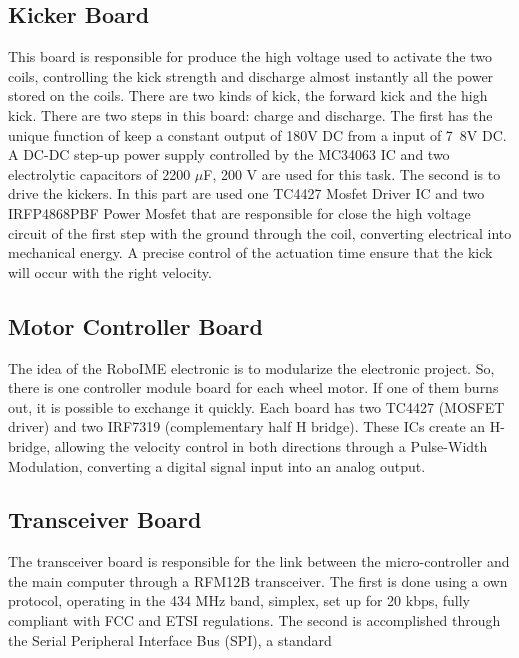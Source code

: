 \subsection{Kicker Board}
This board is responsible for produce the high voltage used to activate the two coils, controlling the kick strength and discharge almost instantly all the power stored on the coils. There are two kinds of kick, the forward kick and the high kick. There are two steps in this board: charge and discharge. The first has the unique function of keep a constant output of 180V DC from a input of 7~8V DC. A DC-DC step-up power supply controlled by the MC34063 IC and two electrolytic capacitors of 2200 $\mu$F, 200 V are used for this task. The second is to drive the kickers. In this part are used one TC4427 Mosfet Driver IC and two IRFP4868PBF Power Mosfet that are responsible for close the high voltage circuit of the first step with the ground through the coil, converting electrical into mechanical energy. A precise control of the actuation time ensure that the kick will occur with the right velocity.


\subsection{Motor Controller Board}
The idea of the RoboIME electronic is to modularize the electronic project. So, there is one controller module board for each wheel motor. If one of them burns out, it is possible to exchange it quickly. Each board has two TC4427 (MOSFET driver) and two IRF7319 (complementary half H bridge). These ICs create an H-bridge, allowing the velocity control in both directions through a Pulse-Width Modulation, converting a digital signal input into an analog output.


\subsection{Transceiver Board}
The transceiver board is responsible for the link between the micro-controller and the main computer through a RFM12B transceiver. The first is done using a own protocol, operating in the 434 MHz band, simplex, set up for 20 kbps, fully compliant with FCC and ETSI regulations. The second is accomplished through the Serial Peripheral Interface Bus (SPI), a standard
